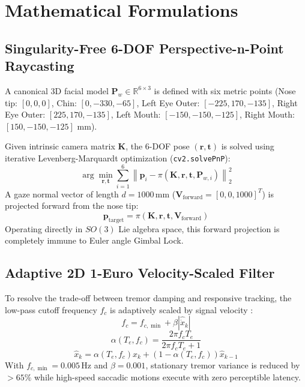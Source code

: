 \documentclass[conference]{IEEEtran}
\begin{document}
\section{Mathematical Formulations}

\subsection{Singularity-Free 6-DOF Perspective-n-Point Raycasting}
A canonical 3D facial model $\mathbf{P}_w \in \mathbb{R}^{6 \times 3}$ is defined with six metric points (Nose tip: $[0, 0, 0]$, Chin: $[0, -330, -65]$, Left Eye Outer: $[-225, 170, -135]$, Right Eye Outer: $[225, 170, -135]$, Left Mouth: $[-150, -150, -125]$, Right Mouth: $[150, -150, -125]$ mm).

Given intrinsic camera matrix $\mathbf{K}$, the 6-DOF pose $(\mathbf{r}, \mathbf{t})$ is solved using iterative Levenberg-Marquardt optimization (\texttt{cv2.solvePnP}):
\begin{equation}
\arg\min_{\mathbf{r}, \mathbf{t}} \sum_{i=1}^{6} \left\| \mathbf{p}_i - \pi(\mathbf{K}, \mathbf{r}, \mathbf{t}, \mathbf{P}_{w,i}) \right\|_2^2
\end{equation}
A gaze normal vector of length $d = 1000\,\text{mm}$ ($\mathbf{V}_{\text{forward}} = [0, 0, 1000]^T$) is projected forward from the nose tip:
\begin{equation}
\mathbf{p}_{\text{target}} = \pi(\mathbf{K}, \mathbf{r}, \mathbf{t}, \mathbf{V}_{\text{forward}})
\end{equation}
Operating directly in $SO(3)$ Lie algebra space, this forward projection is completely immune to Euler angle Gimbal Lock.

\subsection{Adaptive 2D 1-Euro Velocity-Scaled Filter}
To resolve the trade-off between tremor damping and responsive tracking, the low-pass cutoff frequency $f_c$ is adaptively scaled by signal velocity \cite{casiez2012}:
\begin{equation}
f_c = f_{c,\min} + \beta |\hat{\dot{x}}_k|
\end{equation}
\begin{equation}
\alpha(T_e, f_c) = \frac{2\pi f_c T_e}{2\pi f_c T_e + 1}
\end{equation}
\begin{equation}
\hat{x}_k = \alpha(T_e, f_c) x_k + (1 - \alpha(T_e, f_c)) \hat{x}_{k-1}
\end{equation}
With $f_{c,\min} = 0.005\,\text{Hz}$ and $\beta = 0.001$, stationary tremor variance is reduced by $>65\%$ while high-speed saccadic motions execute with zero perceptible latency.
\end{document}
